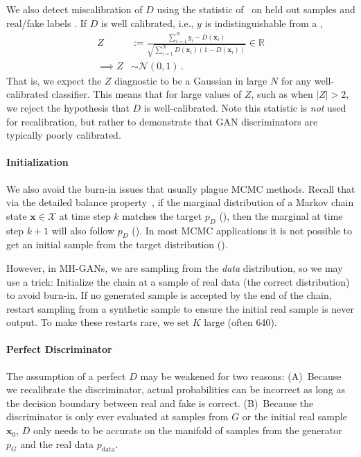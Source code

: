 \documentclass{article}
\renewcommand{\vec}[1]{{\boldsymbol{\mathbf{#1}}}} %
\newcommand{\R}{\mathbb{R}}
\newcommand{\set}[1]{\mathcal{#1}}
\newcommand{\sample}{\sim}
\newcommand{\norm}{\mathcal{N}}
\newcommand{\bern}{\textrm{Bern}}
\newcommand{\PG}{{p_G}}
\newcommand{\PD}{{p_D}}
\newcommand{\PR}{{p_{\textrm{data}}}}
\newcommand{\setx}{\set{X}}
\begin{document}
We also detect miscalibration of $D$ using the statistic of~\citet{Dawid1997} on held out samples \smash{$\vec x_{1:N}$} and real/fake labels .
If $D$ is well calibrated, i.e., $y$ is indistinguishable from a \smash{$y \sample \bern(D(\vec x))$},
\begin{align}
  Z &:= \frac{\sum_{i=1}^N y_i - D(\vec x_i)}{\sqrt{\sum_{i=1}^N D(\vec x_i) (1 - D(\vec x_i))}} \in \R \label{eq:calib score} \\
  \implies Z &\sample \norm(0,1)\,.
\end{align}
That is, we expect the $Z$ diagnostic to be a Gaussian in large $N$ for any well-calibrated classifier.
This means that for large values of $Z$, such as when $|Z| > 2$, we reject the hypothesis that $D$ is well-calibrated.
Note this statistic is \emph{not} used for recalibration, but rather to demonstrate that GAN discriminators are typically poorly calibrated.

\paragraph{Initialization}
We also avoid the burn-in issues that usually plague MCMC methods.
Recall that via the detailed balance property~\citep[Ch.~1]{Gilks1996}, if the marginal distribution of a Markov chain state $\vec x \in \setx$ at time step $k$ matches the target $\PD$ (\smash{$\vec x_k \sample \PD$}), then the marginal at time step $k+1$ will also follow $\PD$ (\smash{$\vec x_{k+1} \sample \PD$})\@.
In most MCMC applications it is not possible to get an initial sample from the target distribution (\smash{$\vec x_0 \sample \PD$})\@.

However, in MH-GANs, we are sampling from the \emph{data} distribution, so we may use a trick:
Initialize the chain at a sample of real data (the correct distribution) to avoid burn-in.
If no generated sample is accepted by the end of the chain, restart sampling from a synthetic sample to ensure the initial real sample is never output.
To make these restarts rare, we set $K$ large (often 640)\@.

\paragraph{Perfect Discriminator}
The assumption of a perfect $D$ may be weakened for two reasons:
(A)~Because we recalibrate the discriminator, actual probabilities can be incorrect as long as the decision boundary between real and fake is correct.
(B)~Because the discriminator is only ever evaluated at samples from $G$ or the initial real sample $\vec x_0$, $D$ only needs to be accurate on the manifold of samples from the generator $\PG$ and the real data $\PR$.
\end{document}

